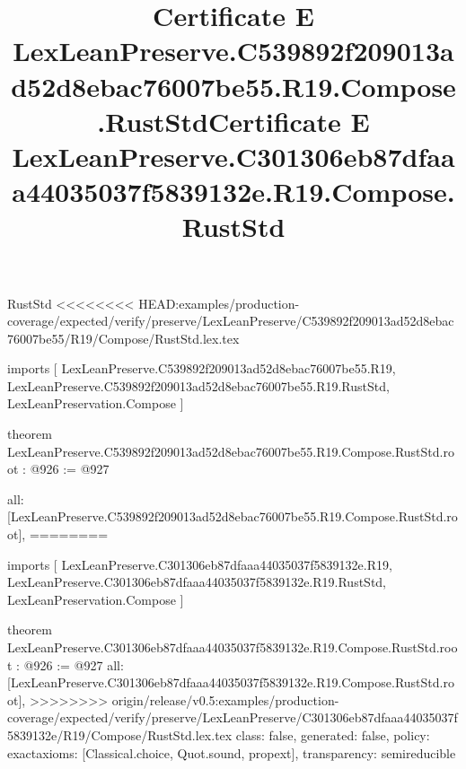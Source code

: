 \begin{lexlean}{RustStd}
<<<<<<<< HEAD:examples/production-coverage/expected/verify/preserve/LexLeanPreserve/C539892f209013ad52d8ebac76007be55/R19/Compose/RustStd.lex.tex
\title{Certificate E LexLeanPreserve.C539892f209013ad52d8ebac76007be55.R19.Compose.RustStd}
\begin{coremodule}
imports [
  LexLeanPreserve.C539892f209013ad52d8ebac76007be55.R19,
  LexLeanPreserve.C539892f209013ad52d8ebac76007be55.R19.RustStd,
  LexLeanPreservation.Compose
]

theorem LexLeanPreserve.C539892f209013ad52d8ebac76007be55.R19.Compose.RustStd.root : @926 := @927 {
  all: [LexLeanPreserve.C539892f209013ad52d8ebac76007be55.R19.Compose.RustStd.root],
========
\title{Certificate E LexLeanPreserve.C301306eb87dfaaa44035037f5839132e.R19.Compose.RustStd}
\begin{coremodule}
imports [
  LexLeanPreserve.C301306eb87dfaaa44035037f5839132e.R19,
  LexLeanPreserve.C301306eb87dfaaa44035037f5839132e.R19.RustStd,
  LexLeanPreservation.Compose
]

theorem LexLeanPreserve.C301306eb87dfaaa44035037f5839132e.R19.Compose.RustStd.root : @926 := @927 {
  all: [LexLeanPreserve.C301306eb87dfaaa44035037f5839132e.R19.Compose.RustStd.root],
>>>>>>>> origin/release/v0.5:examples/production-coverage/expected/verify/preserve/LexLeanPreserve/C301306eb87dfaaa44035037f5839132e/R19/Compose/RustStd.lex.tex
  class: false,
  generated: false,
  policy: exact{axioms: [Classical.choice, Quot.sound, propext]},
  transparency: semireducible
}


\end{coremodule}}
\end{coremodule}
\end{lexlean}
